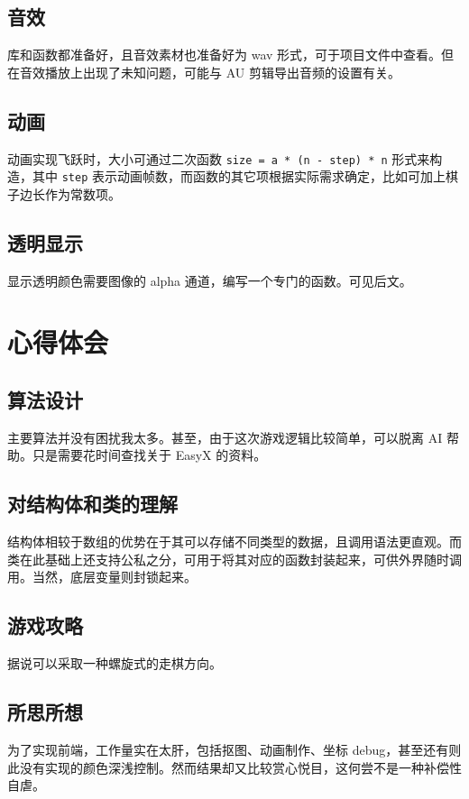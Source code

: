 \documentclass[12pt,a4paper,twoside]{ctexart}
\numberwithin{figure}{section}
\numberwithin{equation}{section}
\begin{document}
\subsection{音效}
库和函数都准备好，且音效素材也准备好为 wav 形式，可于项目文件中查看。但在音效播放上出现了未知问题，可能与 AU 剪辑导出音频的设置有关。

\subsection{动画}
动画实现飞跃时，大小可通过二次函数 \verb|size = a * (n - step) * n| 形式来构造，其中 \verb|step| 表示动画帧数，而函数的其它项根据实际需求确定，比如可加上棋子边长作为常数项。

\subsection{透明显示}
显示透明颜色需要图像的 alpha 通道，编写一个专门的函数。可见后文。

\newpage
\section{心得体会}

\subsection{算法设计}
主要算法并没有困扰我太多。甚至，由于这次游戏逻辑比较简单，可以脱离 AI 帮助。只是需要花时间查找关于 EasyX 的资料。


\subsection{对结构体和类的理解}
结构体相较于数组的优势在于其可以存储不同类型的数据，且调用语法更直观。而类在此基础上还支持公私之分，可用于将其对应的函数封装起来，可供外界随时调用。当然，底层变量则封锁起来。

\subsection{游戏攻略}
据说可以采取一种螺旋式的走棋方向。

\subsection{所思所想}
为了实现前端，工作量实在太肝，包括抠图、动画制作、坐标 debug，甚至还有则此没有实现的颜色深浅控制。然而结果却又比较赏心悦目，这何尝不是一种补偿性自虐。
\end{document}
